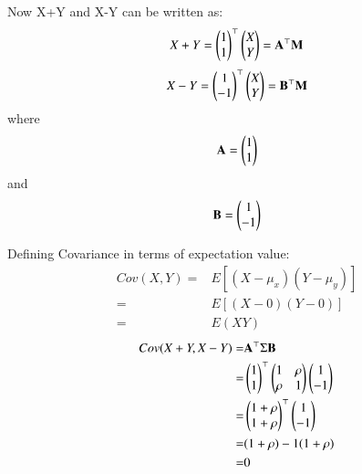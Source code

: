 \documentclass[journal,12pt,twocolumn]{IEEEtran}
\begin{document}
Now X+Y and X-Y can be written as:
\begin{equation}
    X+Y = \begin{pmatrix}1 \\ 1\end{pmatrix} ^\top
            \begin{pmatrix}X \\ Y\end{pmatrix}
    = \mathbf{A^\top} \mathbf{M}
\end{equation}
\begin{equation}
    X-Y = \begin{pmatrix}1 \\ -1\end{pmatrix} ^\top
            \begin{pmatrix}X \\ Y\end{pmatrix}
    =\mathbf{B^\top} \mathbf{M}
\end{equation}
where
\begin{equation}
 \mathbf{A} = \begin{pmatrix}1 \\ 1\end{pmatrix}
\end{equation}
and
\begin{equation}
    \mathbf{B} = \begin{pmatrix}1 \\ -1\end{pmatrix}
\end{equation}

Defining Covariance in terms of expectation value:
\begin{align}
    Cov(X,Y)=& E[(X-\mu_x)(Y-\mu_y)] \\
    =& E[(X-0)(Y-0)]\\
    =& E(XY)
\end{align}
\begin{align}
 Cov(X+Y,X-Y) =& \mathbf{A^\top} \Sigma \mathbf{B} \\
    =& \begin{pmatrix}1 \\ 1\end{pmatrix}^\top
    \begin{pmatrix}
            1 & \rho\\
            \rho & 1 
        \end{pmatrix}
        \begin{pmatrix}1 \\ -1\end{pmatrix}\\ 
    =& \begin{pmatrix}1+\rho \\ 1+\rho\end{pmatrix}^\top
        \begin{pmatrix}1 \\ -1\end{pmatrix}\\
    =& (1+\rho)-1(1+\rho) \\
    =&   0
\end{align}
\end{document}
